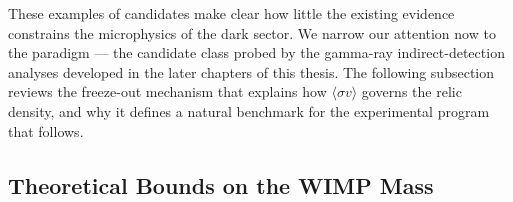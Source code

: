 These examples of candidates make clear how little the existing evidence constrains the microphysics of the dark sector.
We narrow our attention now to the \WIMP paradigm --- the candidate class probed by the gamma-ray indirect-detection analyses developed in the later chapters of this thesis.
The following subsection reviews the freeze-out mechanism that explains how $\langle\sigma v\rangle$ governs the relic density, and why it defines a natural benchmark for the experimental program that follows.




\subsection{Theoretical Bounds on the WIMP Mass}
\label{sec:1.2.3}


